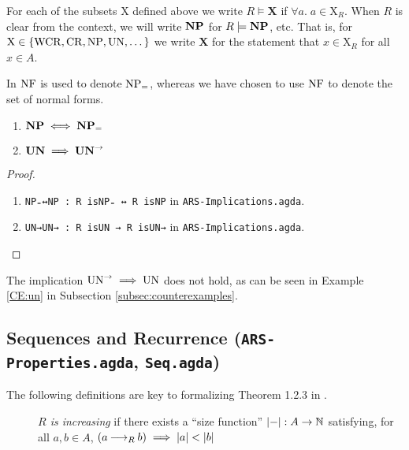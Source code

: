 \begin{notation}
    For each of the subsets $\mathrm{X}$ defined above we write 
    $R \models \mathbf{X}$ if $\forall a.\; a \in \mathrm{X}_R$. When $R$ is clear from the context, we will write $\mathbf{NP}$ for $R \models \mathbf{NP}$, etc.
    That is, for $\mathrm{X} \in \{\mathrm{WCR} , \mathrm{CR} , \mathrm{NP} , \mathrm{UN}, \dots \}$ we write $\mathbf{X}$ for the statement that $x \in \mathrm{X}_R$ for all $x \in A$.
\end{notation}


In \terese $\mathrm{NF}$ is used to denote $\mathrm{NP_=}$, whereas we have chosen to use $\mathrm{NF}$ to denote the set of normal forms.

\begin{proposition}\hfill
    \begin{enumerate}
        \item $\mathbf{NP} \iff \mathbf{NP_=}$
        \item $\mathbf{UN} \implies \mathbf{UN}^{\to}$
    \end{enumerate}
\end{proposition}
\begin{proof} \hfill
    \begin{enumerate}
        \item \verb|NP₌↔NP : R isNP₌ ↔ R isNP| in \texttt{ARS-Implications.agda}.
        \item \verb|UN→UN→ : R isUN → R isUN→| in \texttt{ARS-Implications.agda}.
    \end{enumerate}
\end{proof}

The implication $\mathrm{UN}^{\to} \implies \mathrm{UN}$ does not hold, as can be seen in Example \ref{CE:un} in Subsection \ref{subsec:counterexamples}.

\subsection{Sequences and Recurrence (\texttt{ARS-Properties.agda}, \texttt{Seq.agda})}
The following definitions are key to formalizing Theorem 1.2.3 in \terese.


\begin{definition} \hfill
    \begin{description}
        \item[] \emph{$R$ is increasing} if there exists a ``size function'' $|{-}| : A \to \mathbb{N}$ satisfying, for all $a, b \in A$,
        $(a \mathbin{\longrightarrow_R} b) \implies |a| < |b|$
    \end{description}
\end{definition}

